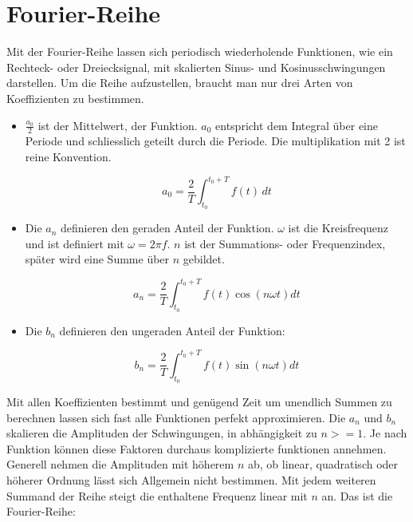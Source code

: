%
%
%
%

\section{Fourier-Reihe\label{fourier:section:GrundlagenFourierAnalyse}}


Mit der Fourier-Reihe lassen sich periodisch wiederholende Funktionen, wie ein Rechteck- oder Dreiecksignal, mit skalierten Sinus- und Kosinusschwingungen darstellen. 
Um die Reihe aufzustellen, braucht man nur drei Arten von Koeffizienten zu bestimmen. 

\begin{itemize}
	\item $\frac{a_0}{2}$ ist der Mittelwert, der Funktion. 
	$a_0$ entspricht dem Integral über eine Periode und schliesslich geteilt durch die Periode.
	Die multiplikation mit 2 ist reine Konvention.
	
	\begin{equation}
		a_0 = \frac{2}{T} \int_{t_0}^{t_0 + T} f(t) \, dt
	\end{equation}
	
	\item Die $a_n$ definieren den geraden Anteil der Funktion. $\omega$ ist die Kreisfrequenz und ist definiert mit $\omega = 2\pi f$. 
	$n$ ist der Summations- oder Frequenzindex, später wird eine Summe über $n$ gebildet.
	
	\begin{equation}
		a_n = \frac{2}{T} \int_{t_0}^{t_0 + T} f(t) \cos\left(n\omega t\right) dt
	\end{equation}
	
	\item Die $b_n$ definieren den ungeraden Anteil der Funktion:
	
	\begin{equation}
		b_n = \frac{2}{T} \int_{t_0}^{t_0 + T} f(t) \sin\left(n\omega t\right) dt
	\end{equation}
	
\end{itemize}


Mit allen Koeffizienten bestimmt und genügend Zeit um unendlich Summen zu berechnen lassen sich fast alle Funktionen perfekt approximieren.
Die $a_n$ und $b_n$ skalieren die Amplituden der Schwingungen, in abhängigkeit zu $n>=1$. 
Je nach Funktion können diese Faktoren durchaus komplizierte funktionen annehmen.
Generell nehmen die Amplituden mit höherem $n$ ab, ob linear, quadratisch oder höherer Ordnung lässt sich Allgemein nicht bestimmen.
Mit jedem weiteren Summand der Reihe steigt die enthaltene Frequenz linear mit $n$ an.
Das ist die Fourier-Reihe:


